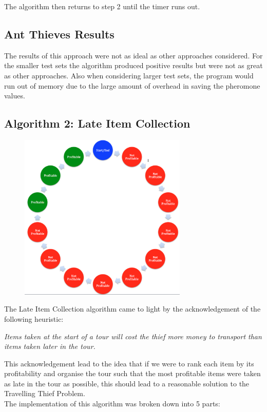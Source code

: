 \documentclass[a4paper,12pt]{article}
\begin{document}
The algorithm then returns to step 2 until the timer runs out.

\subsection*{Ant Thieves Results}


The results of this approach were not as ideal as other approaches considered. For the smaller test sets the algorithm produced positive results but were not as great as other approaches. Also when considering larger test sets, the program would run out of memory due to the large amount of overhead in saving the pheromone values.







\subsection*{Algorithm 2: Late Item Collection}
\begin{figure}[h]
\centering
\includegraphics[width=80mm]{AlgorithmIdea.png}
\end{figure}
The Late Item Collection algorithm came to light by the acknowledgement of the following heuristic:

\begin{center}
\emph{Items taken at the start of a tour will cost the thief more money to transport than items taken later in the tour.}
\end{center}

This acknowledgement lead to the idea that if we were to rank each item by its profitability and organise the tour such that the most profitable items were taken as late in the tour as possible, this should lead to a reasonable solution to the Travelling Thief Problem.\\
The implementation of this algorithm was broken down into 5 parts:
\end{document}
